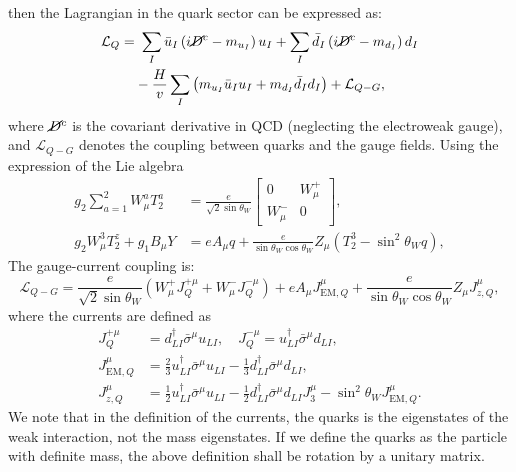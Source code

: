 \documentclass[aps,prb,superscriptaddress,nofootinbib]{revtex4}
\begin{document}
then the Lagrangian in the quark sector can be expressed as:
\begin{equation}
\begin{aligned}
	\mathcal L_Q =&\ \sum_I \bar u_I\left(i\cancel D^c-m_{u_I}\right)u_I + \sum_I \bar d_I \left(i \cancel D^c-m_{d_I}\right)d_I \\
	& -\frac{H}{v} \sum_I\left(m_{u_I}\bar u_I u_I+m_{d_I}\bar d_I d_I \right) + \mathcal L_{Q-G},
\end{aligned}
\end{equation}
where $\cancel D^c$ is the covariant derivative in QCD (neglecting the electroweak gauge), and $\mathcal L_{Q-G}$ denotes the coupling between quarks and the gauge fields.
Using the expression of the Lie algebra
\begin{equation}
\begin{aligned}
	g_2 \sum_{a=1}^2 W^a_\mu T^a_2 &= \frac{e}{\sqrt{2}\sin{\theta_W}}\begin{bmatrix}
		0 & W_\mu^+ \\ W_\mu^- & 0
	\end{bmatrix}, \\
	g_2 W_\mu^3 T^z_2 + g_1 B_\mu Y
	&= e A_\mu q + \frac{e}{\sin{\theta_W}\cos{\theta_W}} Z_\mu \left(T_2^3 - \sin^2{\theta_W} q\right),
\end{aligned}
\end{equation}
The gauge-current coupling is:
\begin{equation}
	\mathcal L_{Q-G} = \frac{e}{\sqrt{2}\sin{\theta_W}} \left(W^{+}_\mu J_Q^{+\mu} + W^{-}_\mu J_Q^{-\mu} \right) + e A_\mu J^{\mu}_{\mathrm{EM},Q} + \frac{e}{\sin{\theta_W}\cos{\theta_W}} Z_\mu J^\mu_{z,Q},
\end{equation}
where the currents are defined as
\begin{equation}
\begin{aligned}
	J^{+\mu}_Q &= d_{LI}^\dagger \bar\sigma^\mu u_{LI}, \quad
	J^{-\mu}_Q = u_{LI}^\dagger \bar\sigma^\mu d_{LI}, \\
	J^\mu_{\mathrm{EM},Q} &= \frac{2}{3} u_{LI}^\dagger \bar\sigma^\mu u_{LI} - \frac{1}{3} d_{LI}^\dagger \bar\sigma^\mu d_{LI}, \\
	J_{z,Q}^\mu &= \frac{1}{2} u_{LI}^\dagger \bar\sigma^\mu u_{LI} - \frac{1}{2} d_{LI}^\dagger \bar\sigma^\mu d_{LI} J^\mu_3-\sin^2{\theta_W}J_{\mathrm{EM},Q}^\mu.
\end{aligned}
\end{equation}
We note that in the definition of the currents, the quarks is the eigenstates of the weak interaction, not the mass eigenstates.
If we define the quarks as the particle with definite mass, the above definition shall be rotation by a unitary matrix.
\end{document}
